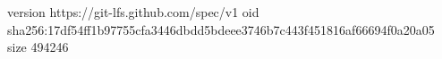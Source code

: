 version https://git-lfs.github.com/spec/v1
oid sha256:17df54ff1b97755cfa3446dbdd5bdeee3746b7c443f451816af66694f0a20a05
size 494246
